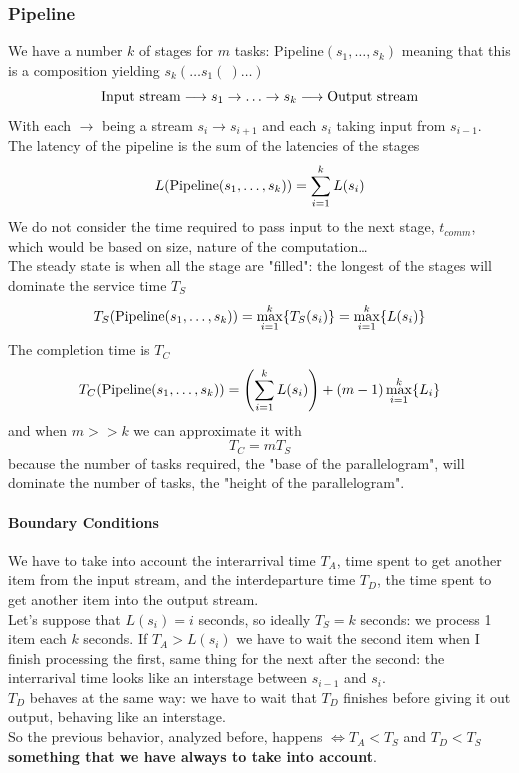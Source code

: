 \documentclass[10pt]{report}
\begin{document}
\subsubsection{Pipeline}
We have a number $k$ of stages for $m$ tasks: Pipeline$(s_1,\ldots,s_k)$ meaning that this is a composition yielding $s_k(\ldots s_1(\:)\ldots)$
$$\hbox{Input stream}\longrightarrow s_1\rightarrow\ldots\rightarrow s_k\longrightarrow\hbox{Output stream}$$
With each $\rightarrow$ being a stream $s_i\rightarrow s_{i+1}$ and each $s_i$ taking input from $s_{i-1}$.\\
The latency of the pipeline is the sum of the latencies of the stages $$L(\hbox{Pipeline}(s_1,\ldots,s_k)) = \sum_{i=1}^k L(s_i)$$
We do not consider the time required to pass input to the next stage, $t_{comm}$, which would be based on size, nature of the computation\ldots\\
The steady state is when all the stage are "filled": the longest of the stages will dominate the service time $T_S$
$$T_S(\hbox{Pipeline}(s_1,\ldots,s_k)) = \max_{i=1}^k\{T_S(s_i)\} = \max_{i=1}^k\{L(s_i)\}$$
The completion time is $T_C$
$$T_C(\hbox{Pipeline}(s_1,\ldots,s_k)) = \left(\sum_{i=1}^k L(s_i)\right) + (m-1)\max_{i=1}^k\{L_i\}$$
and when $m >> k$ we can approximate it with
$$T_C = mT_S$$
because the number of tasks required, the "base of the parallelogram", will dominate the number of tasks, the "height of the parallelogram".
\paragraph{Boundary Conditions} We have to take into account the interarrival time $T_A$, time spent to get another item from the input stream, and the interdeparture time $T_D$, the time spent to get another item into the output stream.\\
Let's suppose that $L(s_i) = i$ seconds, so ideally $T_S = k$ seconds: we process 1 item each $k$ seconds. If $T_A > L(s_i)$ we have to wait the second item when I finish processing the first, same thing for the next after the second: the interrarival time looks like an interstage between $s_{i-1}$ and $s_i$.\\
$T_D$ behaves at the same way: we have to wait that $T_D$ finishes before giving it out output, behaving like an interstage.\\
So the previous behavior, analyzed before, happens $\Leftrightarrow T_A<T_S$ and $T_D<T_S$ \textbf{something that we have always to take into account}.
\end{document}
